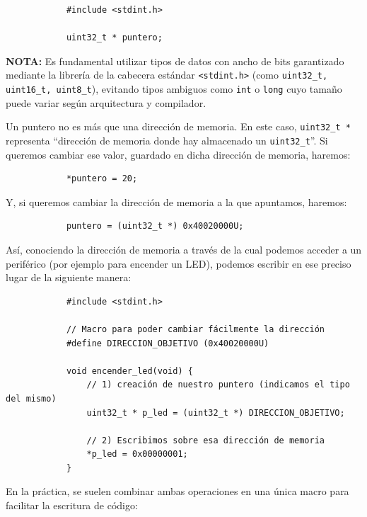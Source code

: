\documentclass[../main.tex]{subfiles}
\begin{document}
        \begin{lstlisting}
            #include <stdint.h>

            uint32_t * puntero;
        \end{lstlisting}

        \textbf{NOTA: } Es fundamental utilizar tipos de datos con ancho de bits garantizado mediante la librería de la cabecera estándar \texttt{<stdint.h>} (como \lstinline|uint32_t, uint16_t, uint8_t|), evitando tipos ambiguos como \texttt{int} o \texttt{long} cuyo tamaño puede variar según arquitectura y compilador.

        Un puntero no es más que una dirección de memoria. En este caso, \lstinline|uint32_t *| representa ``dirección de memoria donde hay almacenado un \lstinline|uint32_t|''. Si queremos cambiar ese valor, guardado en dicha dirección de memoria, haremos:

        \begin{lstlisting}
            *puntero = 20;
        \end{lstlisting}

        Y, si queremos cambiar la dirección de memoria a la que apuntamos, haremos:

        \begin{lstlisting}
            puntero = (uint32_t *) 0x40020000U;
        \end{lstlisting}

        Así, conociendo la dirección de memoria a través de la cual podemos acceder a un periférico (por ejemplo para encender un LED), podemos escribir en ese preciso lugar de la siguiente manera:

        \begin{lstlisting}
            #include <stdint.h>

            // Macro para poder cambiar fácilmente la dirección
            #define DIRECCION_OBJETIVO (0x40020000U)

            void encender_led(void) {
                // 1) creación de nuestro puntero (indicamos el tipo del mismo)
                uint32_t * p_led = (uint32_t *) DIRECCION_OBJETIVO;

                // 2) Escribimos sobre esa dirección de memoria
                *p_led = 0x00000001; 
            }
        \end{lstlisting}

        En la práctica, se suelen combinar ambas operaciones en una única macro para facilitar la escritura de código:
\end{document}
